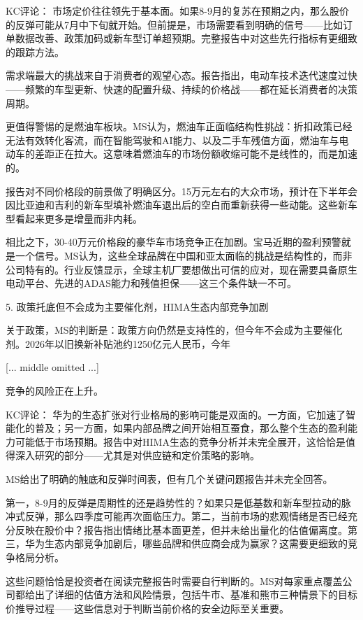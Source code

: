 \documentclass[11pt]{ctexart}
\begin{document}
KC评论： 市场定价往往领先于基本面。如果8-9月的复苏在预期之内，那么股价的反弹可能从7月中下旬就开始。但前提是，市场需要看到明确的信号——比如订单数据改善、政策加码或新车型订单超预期。完整报告中对这些先行指标有更细致的跟踪方法。

需求端最大的挑战来自于消费者的观望心态。报告指出，电动车技术迭代速度过快——频繁的车型更新、快速的配置升级、持续的价格战——都在延长消费者的决策周期。

更值得警惕的是燃油车板块。MS认为，燃油车正面临结构性挑战：折扣政策已经无法有效转化客流，而在智能驾驶和AI能力、以及二手车残值方面，燃油车与电动车的差距正在拉大。这意味着燃油车的市场份额收缩可能不是线性的，而是加速的。

报告对不同价格段的前景做了明确区分。15万元左右的大众市场，预计在下半年会因比亚迪和吉利的新车型填补燃油车退出后的空白而重新获得一些动能。这些新车型看起来更多是增量而非内耗。

相比之下，30-40万元价格段的豪华车市场竞争正在加剧。宝马近期的盈利预警就是一个信号。MS认为，这些全球品牌在中国和亚太面临的挑战是结构性的，而非公司特有的。行业反馈显示，全球主机厂要想做出可信的应对，现在需要具备原生电动平台、先进的ADAS能力和残值担保——这三个条件缺一不可。

5. 政策托底但不会成为主要催化剂，HIMA生态内部竞争加剧

关于政策，MS的判断是：政策方向仍然是支持性的，但今年不会成为主要催化剂。2026年以旧换新补贴池约1250亿元人民币，今年

[... middle omitted ...]

竞争的风险正在上升。

KC评论： 华为的生态扩张对行业格局的影响可能是双面的。一方面，它加速了智能化的普及；另一方面，如果内部品牌之间开始相互蚕食，那么整个生态的盈利能力可能低于市场预期。报告中对HIMA生态的竞争分析并未完全展开，这恰恰是值得深入研究的部分——尤其是对供应链和定价策略的影响。

MS给出了明确的触底和反弹时间表，但有几个关键问题报告并未完全回答。

第一，8-9月的反弹是周期性的还是趋势性的？如果只是低基数和新车型拉动的脉冲式反弹，那么四季度可能再次面临压力。第二，当前市场的悲观情绪是否已经充分反映在股价中？报告指出情绪比基本面更差，但并未给出量化的估值偏离度。第三，华为生态内部竞争加剧后，哪些品牌和供应商会成为赢家？这需要更细致的竞争格局分析。

这些问题恰恰是投资者在阅读完整报告时需要自行判断的。MS对每家重点覆盖公司都给出了详细的估值方法和风险情景，包括牛市、基准和熊市三种情景下的目标价推导过程——这些信息对于判断当前价格的安全边际至关重要。
\end{document}
